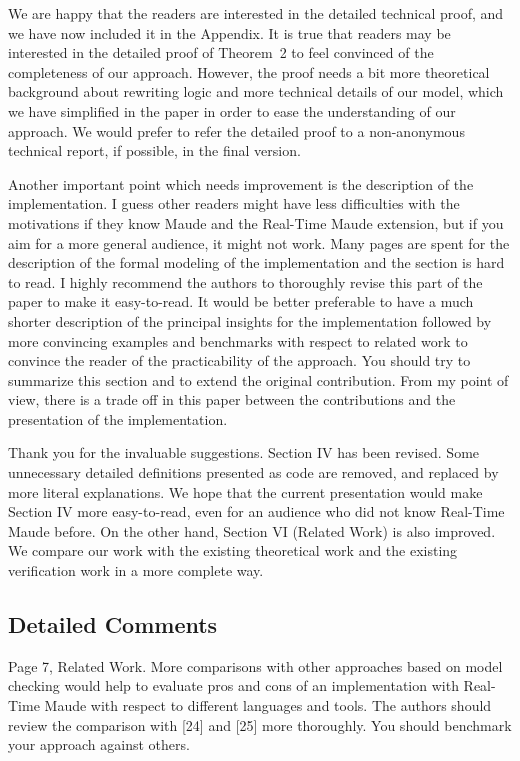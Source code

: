 \documentclass[10pt,journal]{IEEEtran}
\newcommand{\ANSWER}{\medskip\noindent{\bf RESPONSE: }}
\newcommand{\COMMENT}{\medskip\noindent{\bf COMMENT: }}
\begin{document}
We are happy that the readers are interested in the detailed technical
proof, and we have now included it in the Appendix. It is true that
readers may be interested in the detailed proof of Theorem~2 to feel
convinced of the completeness of our approach. However, the proof
needs a bit more theoretical background about rewriting logic and more
technical details of our model, which we have simplified in the paper
in order to ease the understanding of our approach. We would prefer to
refer the detailed proof to a non-anonymous technical report, if
possible, in the final version.

\COMMENT 

Another important point which needs improvement is the description of
the implementation. I guess other readers might have less difficulties
with the motivations if they know Maude and the Real-Time Maude
extension, but if you aim for a more general audience, it might not
work. Many pages are spent for the description of the formal modeling
of the implementation and the section is hard to read. I highly
recommend the authors to thoroughly revise this part of the paper to
make it easy-to-read. It would be better preferable to have a much
shorter description of the principal insights for the implementation
followed by more convincing examples and benchmarks with respect to
related work to convince the reader of the practicability of the
approach. You should try to summarize this section and to extend the
original contribution. From my point of view, there is a trade off in
this paper between the contributions and the presentation of the
implementation.

\ANSWER 

Thank you for the invaluable suggestions. Section IV has been
revised. Some unnecessary detailed definitions presented as code are
removed, and replaced by more literal explanations. We hope that the
current presentation would make Section IV more easy-to-read, even for
an audience who did not know Real-Time Maude before. On the other
hand, Section VI (Related Work) is also improved. We compare our work
with the existing theoretical work and the existing verification work
in a more complete way.


\subsection{Detailed Comments}

\COMMENT 

Page 7, Related Work. More comparisons with other approaches based on
model checking would help to evaluate pros and cons of an
implementation with Real-Time Maude with respect to different
languages and tools. The authors should review the comparison with
[24] and [25] more thoroughly. You should benchmark your approach
against others.
\end{document}
